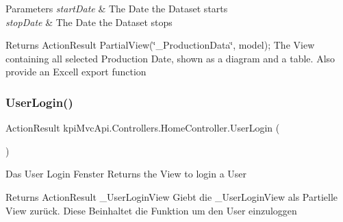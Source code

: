 \begin{DoxyParams}{Parameters}
{\em start\+Date} & The Date the Dataset starts\\
\hline
{\em stop\+Date} & The Date the Dataset stops \\
\hline
\end{DoxyParams}
\begin{DoxyReturn}{Returns}
{\ttfamily Action\+Result Partial\+View(\char`\"{}\+\_\+\+Production\+Data\char`\"{}, model);} The View containing all selected Production Date, shown as a diagram and a table. Also provide an Excell export function 
\end{DoxyReturn}
\mbox{\label{classkpi_mvc_api_1_1_controllers_1_1_home_controller_a52ba84d65a16f3ec9f7c18ef46313b23}} 
\subsubsection{\texorpdfstring{User\+Login()}{UserLogin()}\hspace{0.1cm}{\footnotesize\ttfamily [1/2]}}
{\footnotesize\ttfamily Action\+Result kpi\+Mvc\+Api.\+Controllers.\+Home\+Controller.\+User\+Login (\begin{DoxyParamCaption}{ }\end{DoxyParamCaption})\hspace{0.3cm}{\ttfamily [inline]}}



Das User Login Fenster Returns the View to login a User 

\begin{DoxyReturn}{Returns}
{\ttfamily Action\+Result \+\_\+\+User\+Login\+View} Giebt die \+\_\+\+User\+Login\+View als Partielle View zurück. Diese Beinhaltet die Funktion um den User einzuloggen 
\end{DoxyReturn}
\mbox{\label{classkpi_mvc_api_1_1_controllers_1_1_home_controller_a52ba84d65a16f3ec9f7c18ef46313b23}} 
